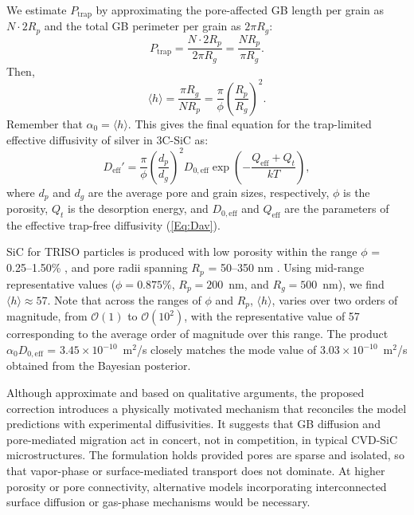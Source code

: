 \documentclass[%
preprint,
amsmath,amssymb,
aps,
]{revtex4-2}
\newcommand{\?}{\stackrel{?}{=}}
\begin{document}
We estimate $P_\text{trap}$ by approximating the pore-affected GB length per grain as $N \cdot 2 R_p$ and the total GB perimeter per grain as $2\pi R_g$:
\begin{equation}
P_\text{trap} = \frac{N \cdot 2R_p}{2\pi R_g} = \frac{N R_p}{\pi R_g}.
\end{equation}
Then,
\begin{equation}
\langle h \rangle = \frac{\pi R_g}{N R_p} = \frac{\pi}{\phi} \left( \frac{R_p}{R_g} \right)^2.
\end{equation}
Remember that $\alpha_0 = \langle h \rangle$. This gives the final equation for the trap-limited effective diffusivity of silver in 3C-SiC as:
\begin{equation}
D_\text{eff}' = \frac{\pi}{\phi} \left( \frac{d_p}{d_g} \right)^2 D_{0,\text{eff}} \exp\left(-\frac{Q_\text{eff}+Q_t}{kT} \right),
\end{equation}
where $d_p$ and $d_g$ are the average pore and grain sizes, respectively, $\phi$ is the porosity, $Q_t$ is the desorption energy, and $D_{0,\text{eff}}$ and $Q_\text{eff}$ are the parameters of the effective trap-free diffusivity (\cref{Eq:Dav}).

SiC for TRISO particles is produced with low porosity within the range $\phi$ = 0.25--1.50\% \cite{Rohbeck2016}, and pore radii spanning $R_p$ = 50--350 nm \cite{Bari2013,Lopez-Honorato2010,Lopez-Honorato2011}. Using mid-range representative values ($\phi = 0.875\%$, $R_p = 200$~nm, and $R_g = 500$~nm), we find $\langle h \rangle \approx 57$. Note that across the ranges of $\phi$ and $R_p$, $\langle h \rangle$, varies over two orders of magnitude, from $\mathcal{O}(1)$ to $\mathcal{O}(10^2)$, with the representative value of 57 corresponding to the average order of magnitude over this range. The product $\alpha_0 D_{0,\text{eff}}$ = $3.45 \times 10^{-10}$~m$^2$/s closely matches the mode value of $3.03 \times 10^{-10}$~m$^2$/s obtained from the Bayesian posterior.

Although approximate and based on qualitative arguments, the proposed correction introduces a physically motivated mechanism that reconciles the model predictions with experimental diffusivities. It suggests that GB diffusion and pore-mediated migration act in concert, not in competition, in typical CVD-SiC microstructures. The formulation holds provided pores are sparse and isolated, so that vapor-phase or surface-mediated transport does not dominate. At higher porosity or pore connectivity, alternative models incorporating interconnected surface diffusion or gas-phase mechanisms would be necessary.
\end{document}
